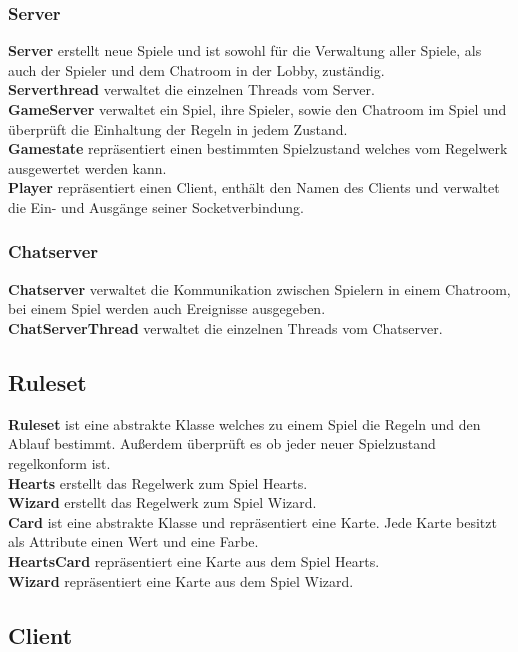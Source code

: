 \documentclass{article}
\begin{document}
		\subsubsection{Server}
			\textbf{Server} erstellt neue Spiele und ist sowohl für die Verwaltung aller Spiele, als auch der Spieler und dem Chatroom in der Lobby, zuständig. \\
			\textbf{Serverthread} verwaltet die einzelnen Threads vom Server. \\
			\textbf{GameServer} verwaltet ein Spiel, ihre Spieler, sowie den Chatroom im Spiel und überprüft die Einhaltung der Regeln in jedem Zustand. \\
			\textbf{Gamestate} repräsentiert einen bestimmten  Spielzustand welches vom Regelwerk ausgewertet werden kann.\\
			\textbf{Player} repräsentiert einen Client, enthält den Namen des Clients und verwaltet die Ein- und Ausgänge seiner Socketverbindung. \\
		\subsubsection{Chatserver}
			\textbf{Chatserver} verwaltet die Kommunikation zwischen Spielern in einem Chatroom, bei einem Spiel werden auch Ereignisse ausgegeben. \\
			\textbf{ChatServerThread} verwaltet die einzelnen Threads vom Chatserver.
	\subsection{Ruleset}
		\textbf{Ruleset} ist eine abstrakte Klasse welches zu einem Spiel die Regeln und den Ablauf bestimmt. Außerdem überprüft es ob jeder neuer Spielzustand regelkonform ist. \\
		\textbf{Hearts} erstellt das Regelwerk zum Spiel Hearts. \\
		\textbf{Wizard} erstellt das Regelwerk zum Spiel Wizard. \\
		\textbf{Card} ist eine abstrakte Klasse und repräsentiert eine Karte. Jede Karte besitzt als Attribute einen Wert und eine Farbe. \\
		\textbf{HeartsCard} repräsentiert eine Karte aus dem Spiel Hearts. \\
		\textbf{Wizard} repräsentiert eine Karte aus dem Spiel Wizard.
	\subsection{Client}
\end{document}
